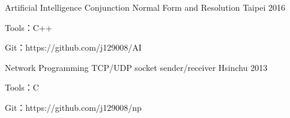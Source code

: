 
\begin{cventries}

  \cventry
    {Artificial Intelligence}
    {Conjunction Normal Form and Resolution}
    {Taipei} %
    {2016} %
    {
      \begin{cvitems} %
        \item {Tools：C++}
        \item {Git：https://github.com/j129008/AI}
      \end{cvitems}
    }


  \cventry
    {Network Programming}
    {TCP/UDP socket sender/receiver}
    {Hsinchu} %
    {2013} %
    {
      \begin{cvitems} %
        \item {Tools：C}
        \item {Git：https://github.com/j129008/np}
      \end{cvitems}
    }

\end{cventries}
